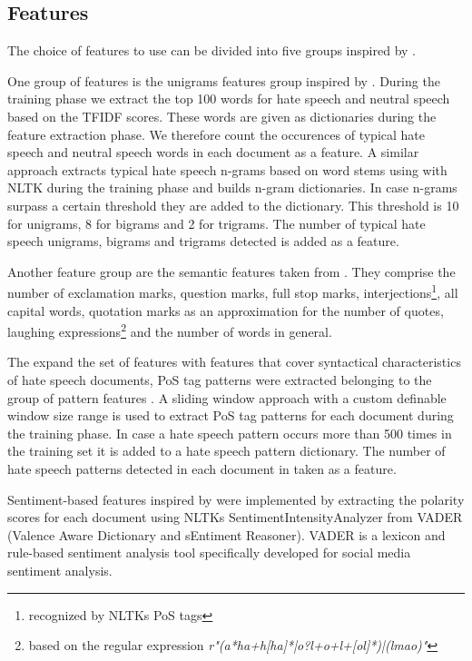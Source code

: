 \subsection{Features}
\label{ch:approachC}

The choice of features to use can be divided into five groups inspired by \cite{Watanabe2018}. 

One group of features is the unigrams features group inspired by \cite{ThomasDavidson2020, Oriola2020, Fortuna2018, Gaydhani2018, Malmasi2017}. During the training phase we extract the top 100 words for hate speech and neutral speech based on the TFIDF scores. These words are given as dictionaries during the feature extraction phase. We therefore count the occurences of typical hate speech and neutral speech words in each document as a feature. A similar approach extracts typical hate speech n-grams based on word stems using with NLTK during the training phase and builds n-gram dictionaries. In case n-grams surpass a certain threshold they are added to the dictionary. This threshold is 10 for unigrams, 8 for bigrams and 2 for trigrams. The number of typical hate speech unigrams, bigrams and trigrams detected is added as a feature. 

Another feature group are the semantic features taken from \cite{ThomasDavidson2020, Watanabe2018}. They comprise the number of exclamation marks, question marks, full stop marks, interjections\footnote{recognized by NLTKs PoS tags}, all capital words, quotation marks as an approximation for the number of quotes, laughing expressions\footnote{based on the regular expression \textit{r"(a*ha+h[ha]*|o?l+o+l+[ol]*)|(lmao)"}} and the number of words in general. 

The expand the set of features with features that cover syntactical characteristics of hate speech documents, PoS tag patterns were extracted belonging to the group of pattern features \cite{Oriola2020, Fortuna2018}. A sliding window approach with a custom definable window size range is used to extract PoS tag patterns for each document during the training phase. In case a hate speech pattern occurs more than 500 times in the training set it is added to a hate speech pattern dictionary. The number of hate speech patterns detected in each document in taken as a feature.

Sentiment-based features inspired by \cite{Oriola2020, Fortuna2018} were implemented by extracting the polarity scores for each document using NLTKs SentimentIntensityAnalyzer from VADER (Valence Aware Dictionary and sEntiment Reasoner). VADER is a lexicon and rule-based sentiment analysis tool specifically developed for social media sentiment analysis. 


